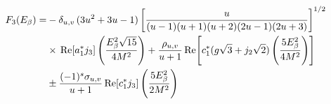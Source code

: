 %
%
%
\begin{align}
F_3(E_{\beta}) = &
- \delta_{u,v} \, (3 u^2 + 3 u -1)
\left[
	\frac{u}{(u-1)(u+1)(u+2)(2u-1)(2u+3)}
\right]^{1/2}\!
\nonumber \\ &
\times 
\,\mathrm{Re}\! \left[
	a_1^* j_3
\right]
\left( 
	\frac{E_{\beta}^2 \sqrt{15} }{4M^2}
\right)
+ 
\frac{\rho_{u,v}}{u+1} 
\,\mathrm{Re}\! \left[
	c_1^*(g\sqrt{3} + j_2\sqrt{2})
	\left(
		\frac{5 E_{\beta}^2}{4 M^2}
	\right)
\right]
\nonumber \\ &
\pm
\frac{(-1)^s \sigma_{u,v} }{u+1} 
\,\mathrm{Re}\! \left[ c_1^*j_3 \right] 
\left( 
	\frac{5E_{\beta}^2}{2 M^2}
\right)
\end{align}
%